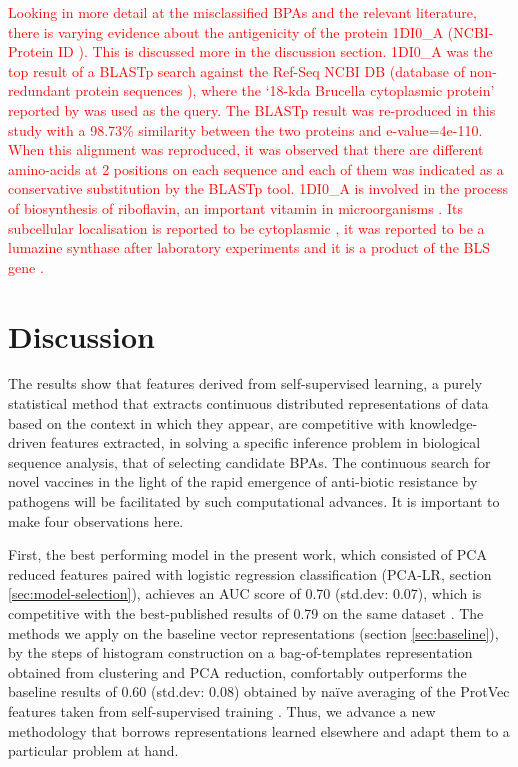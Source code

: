 \documentclass[10pt,journal,compsoc,twoside]{IEEEtran}
\begin{document}
\textcolor{red}{Looking in more detail at the misclassified BPAs and the relevant literature, there is varying evidence about the antigenicity of the protein 1DI0\_A (NCBI-Protein ID \cite{1DI0_A}). This is discussed more in the discussion section. 1DI0\_A was the top result \cite{heinson_2017} of a BLASTp \cite{blast} search against the Ref-Seq NCBI DB (database of non-redundant protein sequences \cite{ncbi-prot-nr-db}), where the ‘18-kda Brucella cytoplasmic protein’ reported by \cite{goldbaum_velikovsky_1999} was used as the query. The BLASTp result was re-produced in this study with a 98.73\% similarity between the two proteins and e-value=4e-110. When this alignment was reproduced, it was observed that there are different amino-acids at 2 positions on each sequence and each of them was indicated as a conservative substitution by the BLASTp tool. 1DI0\_A is involved in the process of biosynthesis of riboflavin, an important vitamin in microorganisms \cite{riboflavin}. Its subcellular localisation is reported to be cytoplasmic \cite{psortb}, it was reported to be a lumazine synthase after laboratory experiments \cite{goldbaum_velikovsky_1999} and it is a product of the BLS gene \cite{BLS}.}


\section{Discussion}
\label{sec:Discussion}

The results show that features derived from self-supervised learning, a purely statistical method that extracts continuous distributed representations of data based on the context in which they appear, are competitive with knowledge-driven features extracted, in solving a specific inference problem in biological sequence analysis, that of selecting candidate BPAs. The continuous search for novel vaccines in the light of the rapid emergence of anti-biotic resistance by pathogens \cite{who_antibiotic_resistance} will be facilitated by such computational advances. It is important to make four observations here. 

First, the best performing model in the present work, which consisted of PCA reduced features paired with logistic regression classification (PCA-LR, section \ref{sec:model-selection}), achieves an AUC score of 0.70 (std.dev: 0.07), which is competitive with the best-published results of 0.79 on the same dataset \cite{heinson_2017} \cite{dalsass_2019}. The methods we apply on the baseline vector representations (section \ref{sec:baseline}), by the steps of histogram construction on a bag-of-templates representation obtained from clustering and PCA reduction, comfortably outperforms the baseline results of 0.60 (std.dev: 0.08) obtained by naïve averaging of the ProtVec features taken from self-supervised training \cite{protvec}. Thus, we advance a new methodology that borrows representations learned elsewhere and adapt them to a particular problem at hand.
\end{document}
